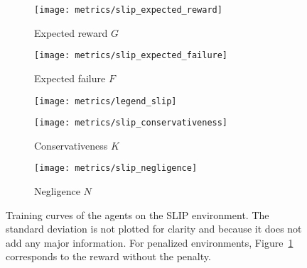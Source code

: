 \begin{figure}[t]
	\centering
	\begin{subfigure}{0.39\textwidth}
		\centering
		\texttt{[image: metrics/slip\_expected\_reward]}
		\caption{Expected reward $G$}
		\label{fig:results:slip:expected reward}
	\end{subfigure}
	\begin{subfigure}{0.39\textwidth}
		\centering
		\texttt{[image: metrics/slip\_expected\_failure]}
		\caption{Expected failure $F$}
		\label{fig:results:slip:expected failure}
	\end{subfigure}
	\begin{subfigure}{0.2\textwidth}
		\centering
		\texttt{[image: metrics/legend\_slip]}
	\end{subfigure}
	\newline
	\begin{subfigure}{0.39\textwidth}
		\centering
		\texttt{[image: metrics/slip\_conservativeness]}
		\caption{Conservativeness $K$}
		\label{fig:results:slip:conservativeness}
	\end{subfigure}
	\begin{subfigure}{0.39\textwidth}
		\centering
		\texttt{[image: metrics/slip\_negligence]}
		\caption{Negligence $N$}
		\label{fig:results:slip:negligence}
	\end{subfigure}
	\begin{subfigure}{0.2\textwidth}
		\hfill
	\end{subfigure}
	\caption{Training curves of the agents on the SLIP environment. The standard deviation is not plotted for clarity and because it does not add any major information. For penalized environments, Figure~\ref{fig:results:slip:expected reward} corresponds to the reward without the penalty.}
	\label{fig:results:slip}
\end{figure}

